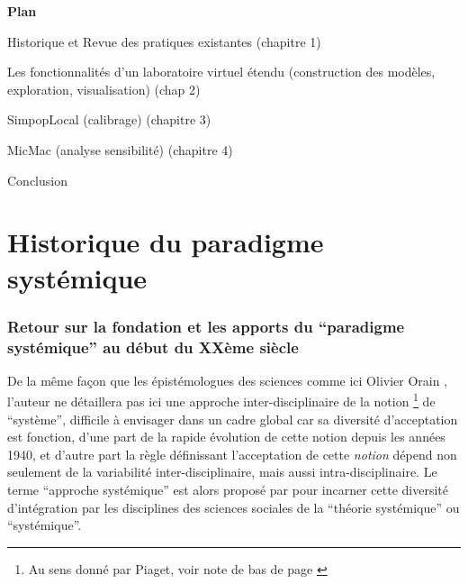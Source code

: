 



\printbibliography[heading=subbibliography]

\textbf{Plan}

Historique et Revue des pratiques existantes (chapitre 1)

Les fonctionnalités d’un laboratoire virtuel étendu (construction des modèles, exploration, visualisation) (chap 2)

SimpopLocal (calibrage) (chapitre 3)

MicMac (analyse sensibilité) (chapitre 4)

Conclusion

\appendix

\chapter{Historique du paradigme systémique}

\subsection{Retour sur la fondation et les apports du \enquote{paradigme systémique} au début du XXème siècle}
\label{ssec:systemique}

De la même façon que les épistémologues des sciences comme ici Olivier Orain \autocite{Orain2001}, l'auteur ne détaillera pas ici une approche inter-disciplinaire de la notion \footnote{Au sens donné par Piaget, voir note de bas de page \autocite {Orain2001}} de \enquote{système}, difficile à envisager dans un cadre global car sa diversité d'acceptation est fonction, d'une part de la rapide évolution de cette notion depuis les années 1940, et d'autre part la règle définissant l'acceptation de cette \textit{notion} dépend non seulement de la variabilité inter-disciplinaire, mais aussi intra-disciplinaire. Le terme \enquote{approche systémique} est alors proposé par \autocite{Orain2001} pour incarner cette diversité d'intégration par les disciplines des sciences sociales de la \enquote{théorie systémique} ou \enquote{systémique}.

